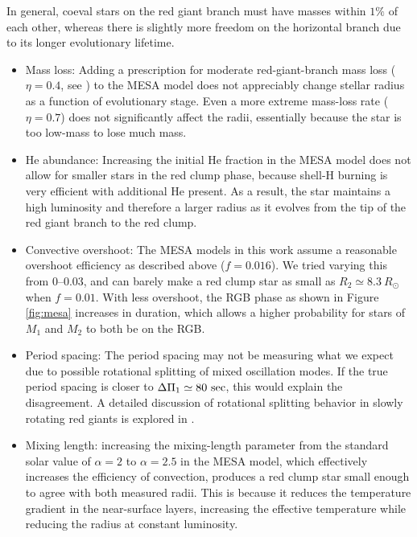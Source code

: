 In general, coeval stars on the red giant branch must have masses within $1\%$ of each other, whereas there is slightly more freedom on the horizontal branch due to its longer evolutionary lifetime. 
\begin{itemize}
\item Mass loss: Adding a prescription for moderate red-giant-branch mass loss ($\eta = 0.4$, see \citealt{mig12}) to the MESA model does not appreciably change stellar radius as a function of evolutionary stage. Even a more extreme mass-loss rate ($\eta = 0.7$) does not significantly affect the radii, essentially because the star is too low-mass to lose much mass.
\item He abundance: Increasing the initial He fraction in the MESA model does not allow for smaller stars in the red clump phase, because shell-H burning is very efficient with additional He present. As a result, the star maintains a high luminosity and therefore a larger radius as it evolves from the tip of the red giant branch to the red clump.
\item Convective overshoot: The MESA models in this work assume a reasonable overshoot efficiency as described above ($f = 0.016$). We tried varying this from 0--0.03, and can barely make a red clump star as small as $R_2 \simeq 8.3 \ R_\odot$ when $f = 0.01$. With less overshoot, the RGB phase as shown in Figure \ref{fig:mesa} increases in duration, which allows a higher probability for stars of $M_1$ and $M_2$ to both be on the RGB.
\item Period spacing: The period spacing  may not be measuring what we expect due to possible rotational splitting of mixed oscillation modes. If the true period spacing is closer to $\Delta \Pi_1 \simeq 80 \ \rm{sec}$, this would explain the disagreement. A detailed discussion of rotational splitting behavior in slowly rotating red giants is explored in \citet{gou13}.
\item Mixing length:  increasing the mixing-length parameter from the standard solar value of $\alpha = 2$ to $\alpha = 2.5$ in the MESA model, which effectively increases the efficiency of convection, produces a red clump star small enough to agree with both measured radii. This is because it reduces the temperature gradient in the near-surface layers, increasing the effective temperature while reducing the radius at constant luminosity. 
\end{itemize}
